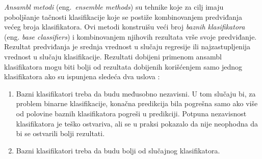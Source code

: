 \documentclass[12pt,oneside]{memoir}
\begin{document}
\textit{Ansambl metodi} (eng.~\textit{ensemble methods}) su tehnike koje za cilj imaju poboljšanje tačnosti klasifikacije koje se postiže kombinovanjem predviđanja većeg broja klasifikatora. Ovi metodi konstruišu veći broj \textit{baznih klasifikatora} (eng.\textit{ base classifiers}) i kombinovanjem njihovih rezultata vrše svoje predviđanje. Rezultat predviđanja je srednja vrednost u slučaju regresije ili najzastupljenija vrednost u slučaju klasifikacije. Rezultati dobijeni primenom ansambl klasifikatora mogu biti bolji od rezultata dobijenih korišćenjem samo jednog klasifikatora ako su ispunjena sledeća dva uslova \cite{mitic}:
\begin{enumerate}[1)]
\item Bazni klasifikatori treba da budu međusobno nezavisni. 
U tom slučaju bi, za problem binarne klasifikacije, konačna predikcija bila pogrešna samo ako više od polovine baznih klasifikatora pogreši u predikciji. Potpuna nezavisnost klasifikatora je teško ostvariva, ali se u praksi pokazalo da nije neophodna da bi se ostvarili bolji rezultati. 
\item Bazni klasifikatori treba da budu bolji od slučajnog klasifikatora.
\end{enumerate}
\end{document}
